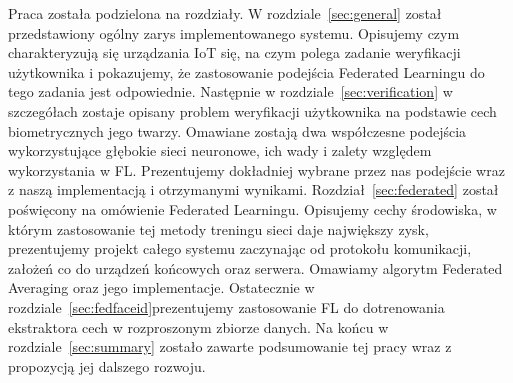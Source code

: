 Praca została podzielona na rozdziały. W rozdziale~\ref{sec:general} został przedstawiony ogólny
zarys implementowanego systemu. Opisujemy czym charakteryzują się urządzania IoT się, na czym
polega zadanie weryfikacji użytkownika i pokazujemy, że zastosowanie podejścia Federated
Learningu do tego zadania jest odpowiednie. Następnie w rozdziale~\ref{sec:verification} w
szczegółach zostaje opisany problem weryfikacji użytkownika na podstawie cech biometrycznych jego
twarzy. Omawiane zostają dwa współczesne podejścia wykorzystujące głębokie sieci neuronowe, ich
wady i zalety względem wykorzystania w FL. Prezentujemy dokładniej wybrane przez nas podejście
wraz z naszą implementacją i otrzymanymi wynikami. Rozdział~\ref{sec:federated} został poświęcony
na omówienie Federated Learningu. Opisujemy cechy środowiska, w którym zastosowanie tej metody
treningu sieci daje największy zysk, prezentujemy projekt całego systemu zaczynając od protokołu
komunikacji, założeń co do urządzeń końcowych oraz serwera. Omawiamy algorytm Federated
Averaging oraz jego implementacje. Ostatecznie w rozdziale~\ref{sec:fedfaceid}prezentujemy zastosowanie FL do dotrenowania
ekstraktora cech w rozproszonym zbiorze danych. Na końcu w rozdziale~\ref{sec:summary} zostało
zawarte podsumowanie tej pracy wraz z propozycją jej dalszego rozwoju.